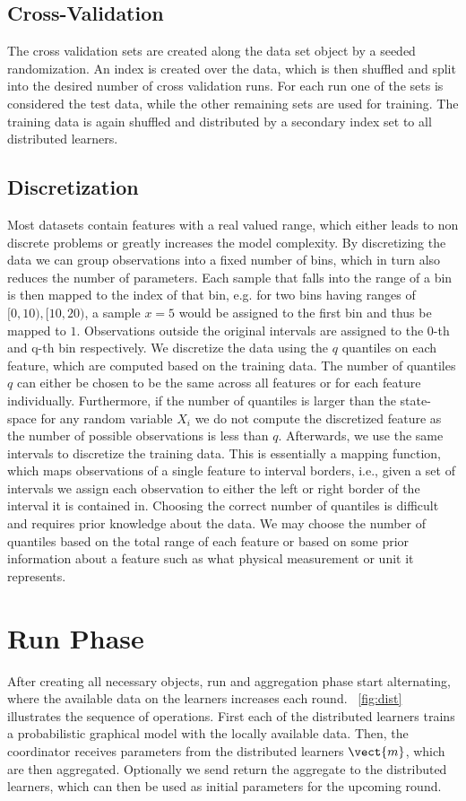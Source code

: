 \subsection{Cross-Validation}
The cross validation sets are created along the data set object by a seeded randomization.
An index is created over the data, which is then shuffled and split into the desired number of cross validation runs.
For each run one of the sets is considered the test data, while the other remaining sets are used for training.
The training data is again shuffled and distributed by a secondary index set to all distributed learners.

\subsection{Discretization}
Most datasets contain features with a real valued range, which either leads to non discrete problems or greatly increases the model complexity.
By discretizing the data we can group observations into a fixed number of bins, which in turn also reduces the number of parameters.
Each sample that falls into the range of a bin is then mapped to the index of that bin, e.g. for two bins having ranges of $[0,10),[10,20)$, a sample $x=5$ would be assigned to the first bin and thus be mapped to $1$. Observations outside the original intervals are assigned to the 0-th and q-th bin respectively.
We discretize the data using the $q$ quantiles on each feature, which are computed based on the training data. 
The number of quantiles $q$ can either be chosen to be the same across all features or for each feature individually.
Furthermore, if the number of quantiles is larger than the state-space for any random variable $X_i$ we do not compute the discretized feature as the number of possible observations is less than $q$.
Afterwards, we use the same intervals to discretize the training data.
This is essentially a mapping function, which maps observations of a single feature to interval borders, i.e., given a set of intervals we assign each observation to either the left or right border of the interval it is contained in.
Choosing the correct number of quantiles is difficult and requires prior knowledge about the data.
We may choose the number of quantiles based on the total range of each feature or based on some prior information about a feature such as what physical measurement or unit it represents.

\section{Run Phase}
After creating all necessary objects, run and aggregation phase start alternating, where the available data on the learners increases each round.
\fig~\ref{fig:dist} illustrates the sequence of operations.
First each of the distributed learners trains a probabilistic graphical model with the locally available data.  
Then, the coordinator receives parameters from the distributed learners $\vect{m}$, which are then aggregated. 
Optionally we send return the aggregate to the distributed learners, which can then be used as initial parameters for the upcoming round.

